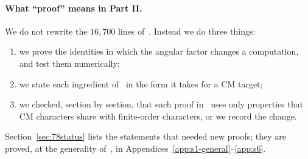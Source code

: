 \documentclass[11pt]{article}
\numberwithin{equation}{section}
\begin{document}
\paragraph{What ``proof'' means in Part II.} We do not rewrite the
$16{,}700$ lines of~\cite{OAI78}. Instead we do three things:
\begin{enumerate}
\item we prove the identities in which the angular factor changes a
 computation, and test them numerically;
\item we state each ingredient of~\cite{OAI78} in the form it takes for a CM
 target;
\item we checked, section by section, that each proof in~\cite{OAI78} uses only
 properties that CM characters share with finite-order characters, or we record
 the change.
\end{enumerate}
Section~\ref{sec:78status} lists the statements that needed new proofs; they are proved, at the
generality of~\cite{OAI78}, in Appendices~\ref{app:s1-general}--\ref{app:s6}.
\end{document}
